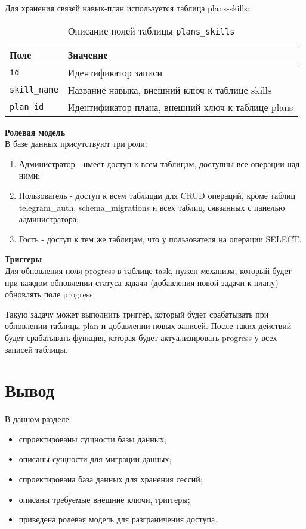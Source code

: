 Для хранения связей навык-план используется таблица plans-skills:
\begin{table}[!ht]
    \caption{Описание полей таблицы \texttt{plans\_skills}}
    \label{tbl:plans-skills}
    \begin{center}
        \begin{tabular}{|p{}p{}|}
            \hline
            \textbf{Поле} & \textbf{Значение} \\\hline
            \texttt{id} & Идентификатор записи \\\hline
            \texttt{skill\_name} & Название навыка, внешний ключ к таблице skills \\\hline
            \texttt{plan\_id} & Идентификатор плана, внешний ключ к таблице plans \\\hline
        \end{tabular}
    \end{center}
\end{table}


\noindent\textbf{Ролевая модель}\\
В базе данных присутствуют три роли:
\begin{enumerate}
\item Администратор - имеет доступ к всем таблицам, доступны все операции над ними;
\item Пользователь - доступ к всем таблицам для CRUD операций, кроме таблиц telegram\_auth, schema\_migrations и всех таблиц, сявзанных с панелью администратора;
\item Гость - доступ к тем же таблицам, что у пользователя на операции SELECT.
\end{enumerate}

\noindent\textbf{Триггеры}\\
Для обновления поля progress в таблице task, нужен механизм, который будет при каждом обновлении статуса задачи (добавления новой задачи к плану) обновлять поле progress.

Такую задачу может выполнить триггер, который будет срабатывать при обновлении таблицы plan и добавлении новых записей. После таких действий будет срабатывать функция, которая будет актуализировать progress у всех записей таблицы.  

\section*{Вывод}
В данном разделе:
\begin{itemize}
\item спроектированы сущности базы данных;
\item описаны сущности для миграции данных;
\item спроектирована база данных для хранения сессий;
\item описаны требуемые внешние ключи, триггеры;
\item приведена ролевая модель для разграничения доступа.
\end{itemize}